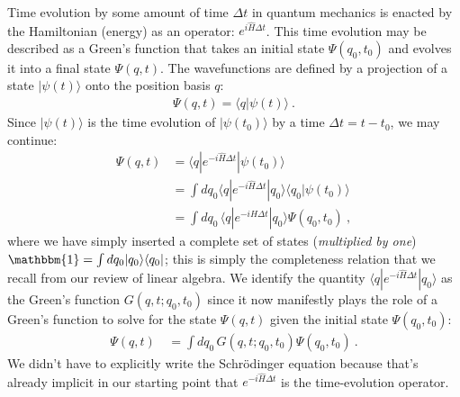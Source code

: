 Time evolution by some amount of time $\Delta t$ in quantum mechanics is enacted by the Hamiltonian (energy) as an operator: $e^{i\hat H\Delta t}$. This time evolution may be described as a Green's function that takes an initial state $\Psi(q_0,t_0)$ and evolves it into a final state $\Psi(q, t)$. The wavefunctions are defined by a projection of a state $|\psi(t)\rangle$ onto the position basis $q$:
\begin{align}
	\Psi(q,t) = \langle q | \psi(t) \rangle \ .
\end{align}
Since $|\psi(t)\rangle$ is the time evolution of $|\psi(t_0)\rangle$ by a time $\Delta t = t-t_0$, we may continue:
\begin{align}
	\Psi(q,t) 
	&= \langle q | e^{-i\hat H \Delta t} |\psi(t_0) \rangle
	\\
	&= \int dq_0\langle q | e^{-i\hat H \Delta t} |q_0 \rangle\langle q_0 |\psi(t_0) \rangle 
	\\
	&= \int dq_0\,\langle q | e^{-i\hat H \Delta t} |q_0 \rangle \Psi(q_0, t_0)
	\ ,
\end{align}
where we have simply inserted a complete set of states (\emph{multiplied by one}) $\mathbbm{1} = \int dq_0 |q_0 \rangle\langle q_0 |$; this is simply the completeness relation that we recall from our review of linear algebra. We identify the quantity $\langle q | e^{-i\hat H \Delta t} |q_0 \rangle$ as the Green's function $G(q,t;q_0,t_0)$ since it now manifestly plays the role of a Green's function to solve for the state $\Psi(q,t)$ given the initial state $\Psi(q_0, t_0)$:
\begin{align}
	\Psi(q,t)\, 
	&= \int dq_0\, G(q,t;q_0,t_0) \Psi(q_0, t_0)
	\ . 
\end{align}
We didn't have to explicitly write the Schr\"odinger equation because that's already implicit in our starting point that $e^{-i\hat H \Delta t}$ is the time-evolution operator. 

